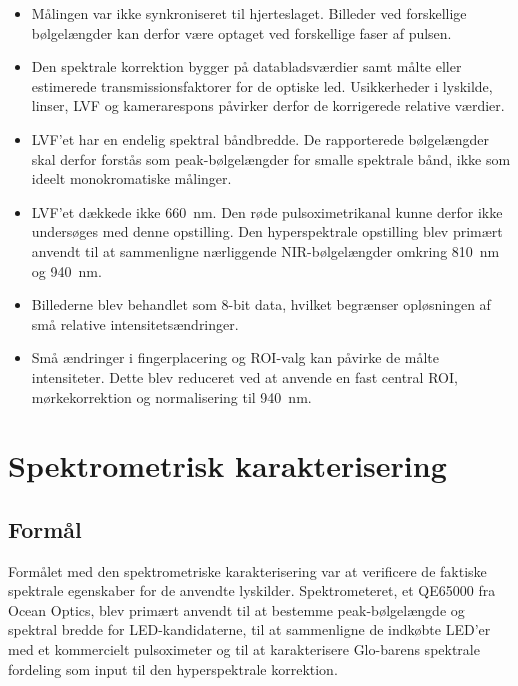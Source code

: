 \begin{itemize}
    \item Målingen var ikke synkroniseret til hjerteslaget. Billeder ved forskellige bølgelængder kan derfor være optaget ved forskellige faser af pulsen.

    \item Den spektrale korrektion bygger på databladsværdier samt målte eller estimerede transmissionsfaktorer for de optiske led. Usikkerheder i lyskilde, linser, LVF og kamerarespons påvirker derfor de korrigerede relative værdier.

    \item LVF'et har en endelig spektral båndbredde. De rapporterede bølgelængder skal derfor forstås som peak-bølgelængder for smalle spektrale bånd, ikke som ideelt monokromatiske målinger.

    \item LVF'et dækkede ikke \SI{660}{nm}. Den røde pulsoximetrikanal kunne derfor ikke undersøges med denne opstilling. Den hyperspektrale opstilling blev primært anvendt til at sammenligne nærliggende NIR-bølgelængder omkring \SI{810}{nm} og \SI{940}{nm}.

    \item Billederne blev behandlet som 8-bit data, hvilket begrænser opløsningen af små relative intensitetsændringer.

    \item Små ændringer i fingerplacering og ROI-valg kan påvirke de målte intensiteter. Dette blev reduceret ved at anvende en fast central ROI, mørkekorrektion og normalisering til \SI{940}{nm}.
\end{itemize}

\section{Spektrometrisk karakterisering}
\label{sec:spectrometer_characterization}

\subsection{Formål}
Formålet med den spektrometriske karakterisering var at verificere de faktiske spektrale egenskaber for de anvendte lyskilder. Spektrometeret, et QE65000 fra Ocean Optics, blev primært anvendt til at bestemme peak-bølgelængde og spektral bredde for LED-kandidaterne, til at sammenligne de indkøbte LED'er med et kommercielt pulsoximeter og til at karakterisere Glo-barens spektrale fordeling som input til den hyperspektrale korrektion.

